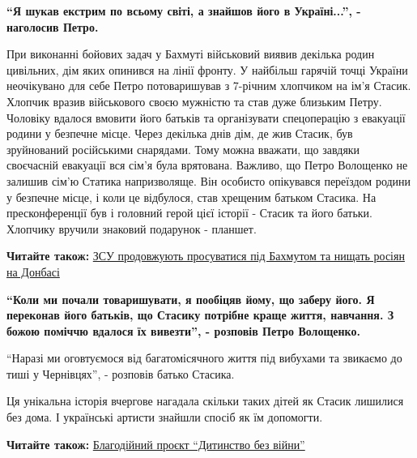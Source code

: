 \begin{leftbar}
  \begingroup
    \bfseries
      \enquote{Я шукав екстрим по всьому світі, а знайшов його в Україні...}, - наголосив Петро.
  \endgroup
\end{leftbar}


При виконанні бойових задач у Бахмуті військовий виявив декілька родин
цивільних, дім яких опинився на лінії фронту. У найбільш гарячій точці України
неочікувано для себе Петро потоваришував з 7-річним хлопчиком на ім'я Стасик.
Хлопчик вразив військового своєю мужністю та став дуже близьким Петру. Чоловіку
вдалося вмовити його батьків та організувати спецоперацію з евакуації родини у
безпечне місце. Через декілька днів дім, де жив Стасик, був зруйнований
російськими снарядами. Тому можна вважати, що завдяки своєчасній евакуації вся
сім'я була врятована. Важливо, що Петро Волощенко не залишив сім'ю Статика
напризволяще. Він особисто опікувався переїздом родини у безпечне місце, і коли
це відбулося, став хрещеним батьком Стасика. На пресконференції був і головний
герой цієї історії - Стасик та його батьки. Хлопчику вручили знаковий подарунок
- планшет.

\textbf{Читайте також:} \href{https://donbas24.news/news/zsu-prodovzuyut-prosuvatisya-pid-baxmutom-ta-nishhat-rosiyan-na-donbasi}{ЗСУ продовжують просуватися під Бахмутом та нищать росіян на Донбасі}


\begin{leftbar}
  \begingroup
    \bfseries
\enquote{Коли ми почали товаришувати, я пообіцяв йому, що заберу його. Я
переконав його батьків, що Стасику потрібне краще життя, навчання. З
божою поміччю вдалося їх вивезти}, - розповів Петро Волощенко.

\enquote{Наразі ми оговтуємося від багатомісячного життя під вибухами та звикаємо до тиші у Чернівцях}, - розповів батько Стасика. 
  \endgroup
\end{leftbar}

Ця унікальна історія вчергове нагадала скільки таких дітей як Стасик лишилися
без дома. І українські артисти знайшли спосіб як їм допомогти.

\textbf{Читайте також:} \href{https://donbas24.news/news/blagodiinii-projekt-ditinstvo-bez-viini}{Благодійний проєкт \enquote{Дитинство без війни}}

